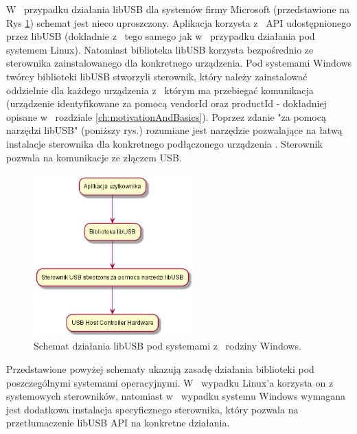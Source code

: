\documentclass{BscUS}
\begin{document}
\noindent W~ przypadku działania libUSB dla systemów firmy Microsoft (przedstawione na Rys \ref{fig:libUsbSchemaWindows}) schemat jest nieco uproszczony. Aplikacja korzysta z~ API udostępnionego przez libUSB (dokładnie z~ tego samego jak w~ przypadku działania pod systemem Linux). Natomiast biblioteka libUSB korzysta bezpośrednio ze sterownika zainstalowanego dla konkretnego urządzenia. Pod systemami Windows twórcy biblioteki libUSB stworzyli sterownik, który należy zainstalować oddzielnie dla każdego urządzenia z~ którym ma przebiegać komunikacja (urządzenie identyfikowane za pomocą vendorId oraz productId - dokładniej opisane w~ rozdziale \ref{ch:motivationAndBasics}). Poprzez zdanie "za pomocą narzędzi libUSB" (poniższy rys.) rozumiane jest narzędzie pozwalające na łatwą instalacje sterownika dla konkretnego podłączonego urządzenia \cite{zadig}. Sterownik pozwala na komunikacje ze złączem USB.
\begin{figure}[H]
\centering
\includegraphics[width=0.55\textwidth]{./img/libUsbSchemaWindows}
\caption{Schemat działania libUSB pod systemami z~ rodziny Windows.}
\label{fig:libUsbSchemaWindows}
\end{figure}
\noindent Przedstawione powyżej schematy ukazują zasadę działania biblioteki pod poszczególnymi systemami operacyjnymi. W~ wypadku Linux'a korzysta on z~ systemowych sterowników, natomiast w~ wypadku systemu Windows wymagana jest dodatkowa instalacja specyficznego sterownika, który pozwala na przetłumaczenie libUSB API na konkretne działania.
\end{document}

